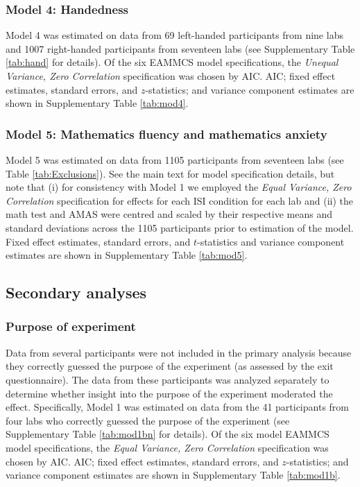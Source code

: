 \documentclass[man,floatsintext]{apa6}
\theoremstyle{definition}
\theoremstyle{definition}
\theoremstyle{definition}
\theoremstyle{remark}
\begin{document}
\begin{appendix}
\subsubsection{Model 4: Handedness}\label{model-4-handedness}

Model 4 was estimated on data from 69 left-handed participants from nine
labs and 1007 right-handed participants from seventeen labs (see
Supplementary Table \ref{tab:hand} for details). Of the six EAMMCS model
specifications, the \emph{Unequal Variance, Zero Correlation}
specification was chosen by AIC. AIC; fixed effect estimates, standard
errors, and \(z\)-statistics; and variance component estimates are shown
in Supplementary Table \ref{tab:mod4}.

\subsubsection{Model 5: Mathematics fluency and mathematics
anxiety}\label{model-5-mathematics-fluency-and-mathematics-anxiety}

Model 5 was estimated on data from 1105 participants from seventeen labs
(see Table \ref{tab:Exclusions}). See the main text for model
specification details, but note that (i) for consistency with Model 1 we
employed the \emph{Equal Variance, Zero Correlation} specification for
effects for each ISI condition for each lab and (ii) the math test and
AMAS were centred and scaled by their respective means and standard
deviations across the 1105 participants prior to estimation of the
model. Fixed effect estimates, standard errors, and \(t\)-statistics and
variance component estimates are shown in Supplementary Table
\ref{tab:mod5}.

\subsection{Secondary analyses}\label{secondary-analyses}

\subsubsection{Purpose of experiment}\label{purpose-of-experiment}

Data from several participants were not included in the primary analysis
because they correctly guessed the purpose of the experiment (as
assessed by the exit questionnaire). The data from these participants
was analyzed separately to determine whether insight into the purpose of
the experiment moderated the effect. Specifically, Model 1 was estimated
on data from the 41 participants from four labs who correctly guessed
the purpose of the experiment (see Supplementary Table \ref{tab:mod1bn}
for details). Of the six model EAMMCS model specifications, the
\emph{Equal Variance, Zero Correlation} specification was chosen by AIC.
AIC; fixed effect estimates, standard errors, and \(z\)-statistics; and
variance component estimates are shown in Supplementary Table
\ref{tab:mod1b}.


\end{appendix}
\end{document}
